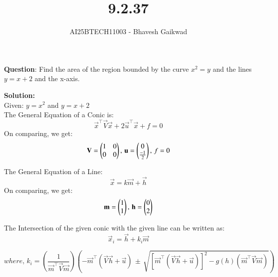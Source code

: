 \documentclass[journal]{IEEEtran}
\begin{document}

\vspace{3cm}

\title{9.2.37}
\author{AI25BTECH11003 - Bhavesh Gaikwad}
{\let\newpage\relax\maketitle}

\renewcommand{\thefigure}{\theenumi}
\renewcommand{\thetable}{\theenumi}
\setlength{\intextsep}{10pt} 


\renewcommand{\thetable}{\theenumi}


\textbf{Question}: Find the area of the region bounded by the curve $x^2 = y$ and the lines $y = x + 2$ and the x-axis.

\textbf{Solution:}\\
Given: $y = x^2$ and $y = x+2$\\

The General Equation of a Conic is: 
\begin{equation}
    \vec{x}^\top\vec{V}\vec{x} + 2\vec{u}^\top\vec{x} + f = 0
\end{equation}
On comparing, we get:
\begin{equation}
    \mathbf{V} = \begin{pmatrix}1 & 0 \\ 0 & 0\end{pmatrix}, \, \mathbf{u} = \begin{pmatrix}0 \\ \frac{-1}{2}\end{pmatrix}, \, f =0
\end{equation}

The General Equation of a Line:
\begin{equation}
    \vec{x} = k\vec{m} + \vec{h}
\end{equation}
On comparing, we get:
\begin{equation}
    \mathbf{m} = \begin{pmatrix}1 \\ 1\end{pmatrix}, \, \mathbf{h} = \begin{pmatrix}0 \\ 2\end{pmatrix}
\end{equation}

The Intersection of the given conic with the given line can be written as:
\begin{equation}
    \vec{x}_i = \vec{h} + k_i\vec{m}
\end{equation}

\begin{equation}
    where, \, k_i = \left( \dfrac{1}{\vec{m}^\top\vec{V}\vec{m}} \right) \left( 
    -\vec{m}^\top(\vec{V}\vec{h}+\vec{u}) \, \pm \, \sqrt{[\vec{m}^\top(\vec{V}\vec{h}+\vec{u})]^2 - g(h)(\vec{m}^\top\vec{V}\vec{m})} \right) 
\end{equation}
\end{document}
